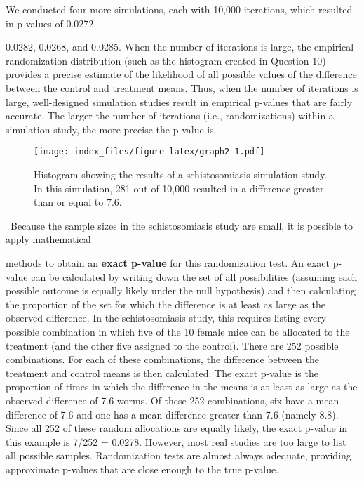 \documentclass[
]{report}
\theoremstyle{definition}
\theoremstyle{definition}
\theoremstyle{definition}
\theoremstyle{definition}
\theoremstyle{remark}
\begin{document}
We conducted four more simulations, each with 10,000 iterations, which resulted in p-values of 0.0272,

0.0282, 0.0268, and 0.0285. When the number of iterations is large, the empirical randomization distribution
(such as the histogram created in Question 10) provides a precise estimate of the likelihood of all possible values of the difference between the control and treatment means. Thus, when the number of iterations is large,
well-designed simulation studies result in empirical p-values that are fairly accurate. The larger the number
of iterations (i.e., randomizations) within a simulation study, the more precise the p-value is.

\begin{figure}
\centering
\texttt{[image: index\_files/figure-latex/graph2-1.pdf]}
\caption{\label{fig:graph2}Histogram showing the results of a schistosomiasis simulation study. In this simulation, 281 out of 10,000 resulted in a difference greater than or equal to 7.6.}
\end{figure}

~Because the sample sizes in the schistosomiasis study are small, it is possible to apply mathematical

methods to obtain an \textbf{exact p-value} for this randomization test. An exact p-value can be calculated by writing
down the set of all possibilities (assuming each possible outcome is equally likely under the null hypothesis)
and then calculating the proportion of the set for which the difference is at least as large as the observed difference.
In the schistosomiasis study, this requires listing every possible combination in which five of the 10
female mice can be allocated to the treatment (and the other five assigned to the control). There are 252 possible
combinations. For each of these combinations, the difference between the treatment and control means
is then calculated. The exact p-value is the proportion of times in which the difference in the means is at least
as large as the observed difference of 7.6 worms. Of these 252 combinations, six have a mean difference of
7.6 and one has a mean difference greater than 7.6 (namely 8.8). Since all 252 of these random allocations are
equally likely, the exact p-value in this example is 7/252 = 0.0278. However, most real studies are too large
to list all possible samples. Randomization tests are almost always adequate, providing approximate p-values
that are close enough to the true p-value.

\large
\end{document}
